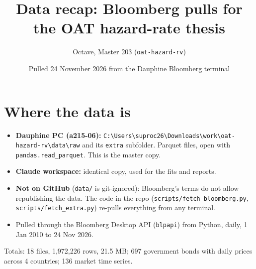 \documentclass[10pt,a4paper]{article}
\title{\textbf{Data recap: Bloomberg pulls for the OAT hazard-rate thesis}}
\author{Octave, Master 203 (\texttt{oat-hazard-rv})}
\date{Pulled 24 November 2026 from the Dauphine Bloomberg terminal}
\begin{document}
\maketitle

\section*{Where the data is}
\begin{itemize}\itemsep0pt
\item \textbf{Dauphine PC (a215-06):} \texttt{C:\textbackslash{}Users\textbackslash{}suproc26\textbackslash{}Downloads\textbackslash{}work\textbackslash{}oat-hazard-rv\textbackslash{}data\textbackslash{}raw} and its \texttt{extra} subfolder. Parquet files, open with
\texttt{pandas.read\_parquet}. This is the master copy.
\item \textbf{Claude workspace:} identical copy, used for the fits and reports.
\item \textbf{Not on GitHub} (\texttt{data/} is git-ignored): Bloomberg's terms do not allow republishing the data. The code
in the repo (\texttt{scripts/fetch\_bloomberg.py}, \texttt{scripts/fetch\_extra.py}) re-pulls everything from any terminal.
\item Pulled through the Bloomberg Desktop API (\texttt{blpapi}) from Python, daily, 1 Jan 2010 to 24 Nov 2026.
\end{itemize}
Totals: 18 files, 1,972,226 rows, 21.5 MB;
697 government bonds with daily prices across 4 countries; 136 market time series.
\end{document}
